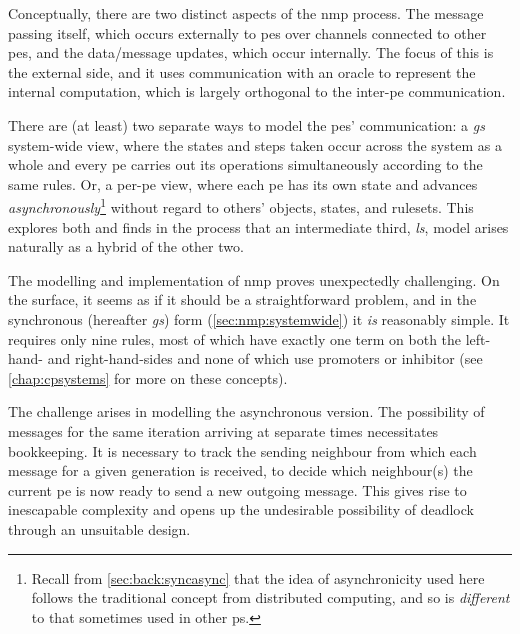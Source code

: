 Conceptually, there are two distinct aspects of the \gls{nmp} process.  The message passing itself, which occurs externally to \glspl{pe} over channels connected to other \glspl{pe}, and the data/message updates, which occur internally.  The focus of this  is the external side, and it uses communication with an oracle to represent the internal computation, which is largely orthogonal to the inter-\gls{pe} communication.

There are (at least) two separate ways to model the \glspl{pe}' communication:  a \emph{\gls{gs}} system-wide view, where the states and steps taken occur across the system as a whole and every \gls{pe} carries out its operations simultaneously according to the same rules.  Or, a per-\gls{pe} view, where each \gls{pe} has its own state and advances \emph{asynchronously}\footnote{Recall from \vref{sec:back:syncasync} that the idea of asynchronicity used here follows the traditional concept from distributed computing, and so is \emph{different} to that sometimes used in other \gls{ps}.} without regard to others' objects, states, and rulesets.  This  explores both and finds in the process that an intermediate third, \emph{\gls{ls}}, model arises naturally as a hybrid of the other two.

The modelling and implementation of \gls{nmp} proves unexpectedly challenging.  On the surface, it seems as if it should be a straightforward problem, and in the synchronous (hereafter \emph{\gls{gs}}) form (\cref{sec:nmp:systemwide}) it \emph{is} reasonably simple.  It requires only nine rules, most of which have exactly one term on both the left-hand- and right-hand-sides and none of which use promoters or \gls{inhibitor} (see \cref{chap:cpsystems} for more on these concepts).


The challenge arises in modelling the asynchronous version.  The possibility of messages for the same iteration arriving at separate times necessitates bookkeeping.  It is necessary to track the sending neighbour from which each message for a given generation is received, to decide which neighbour(s) the current \gls{pe} is now ready to send a new outgoing message.  This gives rise to inescapable complexity and opens up the undesirable possibility of deadlock through an unsuitable design.

